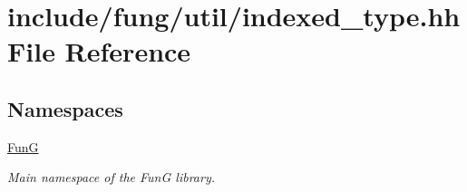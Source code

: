 \hypertarget{indexed__type_8hh}{}\section{include/fung/util/indexed\+\_\+type.hh File Reference}
\label{indexed__type_8hh}
\subsection*{Namespaces}
\begin{DoxyCompactItemize}
\item 
 \hyperlink{namespaceFunG}{FunG}
\begin{DoxyCompactList}\small\item\em Main namespace of the FunG library. \end{DoxyCompactList}\end{DoxyCompactItemize}

